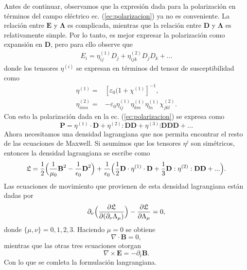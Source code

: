 Antes de continuar, observamos que la expresión dada para la polarización en términos del campo el\'{e}ctrico ec. (\ref{ec:polarizacion}) ya no es conveniente. La relación entre $\textbf{E}$ y $\mathbf{\Lambda}$ es complicada,
mientras que la relación entre $\textbf{D}$ y $\mathbf{\Lambda}$ es relativamente simple. Por lo tanto, es mejor expresar la polarización como expansión en $\textbf{D}$, pero para ello observe que
\begin{align}
E_i=\eta_{ij}^{(1)}D_j+\eta_{ijk}^{(2)}D_jD_k+...
\end{align}
donde los tensores $\eta^{(i)}$ se expresan en t\'{e}rminos del tensor de susceptibilidad como
\begin{align}
 \eta^{(1)}=&[\varepsilon_0(1+\chi^{(1)}]^{-1},\\
\eta^{(2)}_{imn}=&-\varepsilon_0\eta_{ij}^{(1)}\eta_{km}^{(1)}\eta_{ln}^{(1)}\chi_{jkl}^{(2)}.
\end{align}
Con esto la polarizaci\'{o}n dada en la ec. (\ref{ec:polarizacion}) se expresa como
\begin{equation}
\textbf{P}=\eta^{(1)}\cdot\textbf{D}+\eta^{(2)}:\textbf{D}\textbf{D}+\eta^{(3)}\vdots\textbf{D}\textbf{D}\textbf{D}+...
\end{equation}
Ahora necesitamos una densidad lagrangiana que nos permita encontrar el resto de las ecuaciones de Maxwell. Si asumimos que los tensores $\eta^{j}$ son simétricos, entonces la densidad lagrangiana se escribe como
\begin{equation}
\mathfrak{L}=\frac{1}{2}\Bigl(\frac{1}{\mu_0}\textbf{B}^2-\frac{1}{\epsilon_0}\textbf{D}^2\Bigr)+\frac{1}{\epsilon_0}\Bigl(\frac{1}{2}\textbf{D}\cdot\eta^{(1)}\cdot\textbf{D}+\frac{1}{3}\textbf{D}:\eta^{(2)}:\textbf{D}\textbf{D}+...\Bigr).
\end{equation}
Las ecuaciones de movimiento que provienen de esta densidad lagrangiana están dadas por
\begin{equation}
\partial_{\nu}\Bigl(\frac{\partial \mathfrak{L}}{\partial(\partial_{\nu} \Lambda_{\mu})}\Bigr)-\frac{\partial \mathfrak{L}}{\partial \Lambda_{\mu}}=0,
\end{equation}
donde $\{\mu,\nu\}=0,1,2,3.$ Haciendo $\mu=0$ se obtiene
\begin{equation}
\nabla\cdot\textbf{B}=0,
\end{equation}
mientras que las otras tres ecuaciones otorgan
\begin{equation}
\nabla\times\textbf{E}=-\partial_t\textbf{B}.
\end{equation}
Con lo que se comleta la formulaci\'on langrangiana.\\


